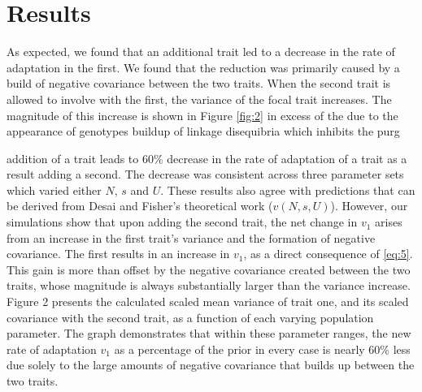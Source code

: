 \documentclass[11pt,twocolumn]{article}
\begin{document}
\section*{Results}
\label{sec:results}
As expected, we found that an additional trait led to a decrease in the rate of adaptation in the first. We found that the reduction was primarily caused by a build of negative covariance between the two traits. When the second trait is allowed to involve with the first, the variance of the focal trait increases. The magnitude of this increase is shown in Figure \ref{fig:2} in excess of the due to the appearance of genotypes buildup of linkage disequibria which inhibits the purg 

addition of a trait leads to 60\% decrease in the rate of adaptation of a trait as a result adding a second. The decrease was consistent across three parameter sets which varied either $N$, $s$ and $U$. These results also agree with predictions that can be derived from Desai and Fisher's theoretical work ($v(N,s,U)$). However, our simulations show that upon adding the second trait, the net change in $v_1$ arises from an increase in the first trait's variance and the formation of negative covariance. The first results in an increase in $v_1$, as a direct consequence of \eqref{eq:5}. This gain is more than offset by the negative covariance created between the two traits, whose magnitude is always substantially larger than the variance increase.  Figure 2 presents the calculated scaled mean variance of trait one, and its scaled covariance with the second trait, as a function of each varying population parameter. The graph demonstrates that within these parameter ranges, the new rate of adaptation $v_1$ as a percentage of the prior in every case is nearly 60\% less due solely to the large amounts of negative covariance that builds up between the two traits.\par
\end{document}
